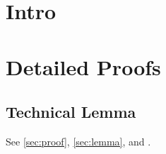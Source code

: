 \documentclass{wrapper}
\begin{document}
\wrapperclass\articleclass\layoutmode\hypermode
\tableofcontents
\section{Intro}
\appendices
\section{Detailed Proofs}\label{sec:proof}
\subsection{Technical Lemma}\label{sec:lemma}
See \autoref{sec:proof}, \autoref{sec:lemma}, and .
\end{document}
